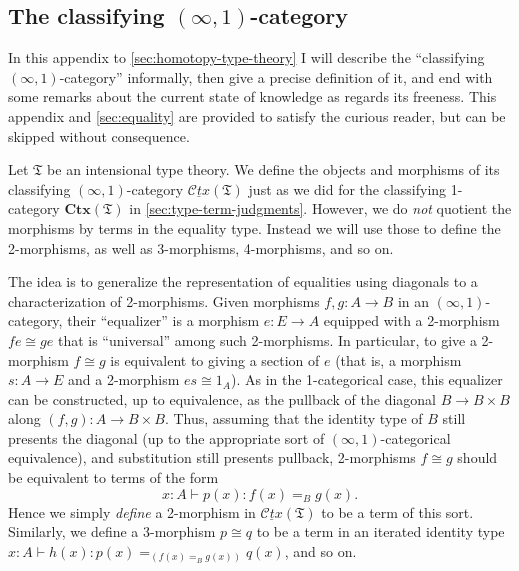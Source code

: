 \documentclass[12pt]{article}
\def\oo{\ensuremath{\infty}}
\def\io{\ensuremath{(\oo,1)}}
\def\types{\vdash}
\def\fT{\mathfrak{T}}
\def\CtxT{\mathbf{Ctx}(\fT)}
\def\cCtx{\underline{\mathscr{C}\!\mathit{tx}}}
\def\cCtxT{\cCtx(\fT)}
\numberwithin{equation}{section}
\begin{document}
\begin{subappendices}

\subsection{The classifying \io-category}
\label{sec:semantics}

In this appendix to \cref{sec:homotopy-type-theory} I will describe the ``classifying \io-category'' informally, then give a precise definition of it, and end with some remarks about the current state of knowledge as regards its freeness.
This appendix and \cref{sec:equality} are provided to satisfy the curious reader, but can be skipped without consequence.

Let $\fT$ be an intensional type theory.
We define the objects and morphisms of its classifying $\io$-category $\cCtxT$ just as we did for the classifying 1-category $\CtxT$ in \cref{sec:type-term-judgments}.
However, we do \emph{not} quotient the morphisms by terms in the equality type.
Instead we will use those to define the 2-morphisms, as well as 3-morphisms, 4-morphisms, and so on.

The idea is to generalize the representation of equalities using diagonals to a characterization of 2-morphisms.
Given morphisms $f,g:A\to B$ in an $\io$-category, their ``equalizer'' is a morphism $e:E\to A$ equipped with a 2-morphism $f e \cong g e$ that is ``universal'' among such 2-morphisms.
In particular, to give a 2-morphism $f\cong g$ is equivalent to giving a section of $e$ (that is, a morphism $s:A\to E$ and a 2-morphism $e s \cong 1_A$).
As in the 1-categorical case, this equalizer can be constructed, up to equivalence, as the pullback of the diagonal $B\to B\times B$ along $(f,g):A\to B\times B$.
Thus, assuming that the identity type of $B$ still presents the diagonal (up to the appropriate sort of $\io$-categorical equivalence), and substitution still presents pullback, 2-morphisms $f\cong g$ should be equivalent to terms of the form
\begin{equation}
  x:A \types p(x):f(x)=_B g(x).\label{eq:ctx-2mor}
\end{equation}
Hence we simply \emph{define} a 2-morphism in $\cCtxT$ to be a term of this sort.
Similarly, we define a 3-morphism $p\cong q$ to be a term in an iterated identity type $x:A \types h(x):p(x)=_{(f(x)=_B g(x))} q(x)$, and so on.


\end{subappendices}
\end{document}
